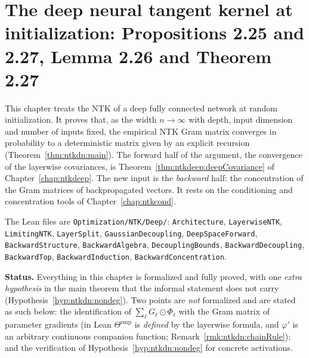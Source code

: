 \chapter{The deep neural tangent kernel at initialization: Propositions 2.25 and 2.27, Lemma 2.26 and Theorem 2.27}\label{chap:ntkdn}

This chapter treats the NTK of a deep fully connected network at random initialization. It proves that, as the width $n\to\infty$ with depth, input dimension and number of inputs fixed, the empirical NTK Gram matrix converges in probability to a deterministic matrix given by an explicit recursion (Theorem~\ref{thm:ntkdn:main}). The forward half of the argument, the convergence of the layerwise covariances, is Theorem~\ref{thm:ntkdeep:deepCovariance} of Chapter~\ref{chap:ntkdeep}. The new input is the \emph{backward} half: the concentration of the Gram matrices of backpropagated vectors. It rests on the conditioning and concentration tools of Chapter~\ref{chap:ntkcond}.

The Lean files are \texttt{Optimization/NTK/Deep/}: \texttt{Architecture}, \texttt{LayerwiseNTK}, \texttt{LimitingNTK}, \texttt{LayerSplit}, \texttt{GaussianDecoupling}, \texttt{DeepSpaceForward}, \texttt{BackwardStructure}, \texttt{BackwardAlgebra}, \texttt{DecouplingBounds}, \texttt{BackwardDecoupling}, \texttt{BackwardTop}, \texttt{BackwardInduction}, \texttt{BackwardConcentration}.

\medskip\noindent\textbf{Status.}
Everything in this chapter is formalized and fully proved, with one \emph{extra hypothesis} in the main theorem that the informal statement does not carry (Hypothesis~\ref{hyp:ntkdn:nondeg}). Two points are \emph{not} formalized and are stated as such below: the identification of $\sum_\ell G_\ell\odot\Phi_\ell$ with the Gram matrix of parameter gradients (in Lean $\Theta^{\mathrm{emp}}$ is \emph{defined} by the layerwise formula, and $\varphi'$ is an arbitrary continuous companion function; Remark~\ref{rmk:ntkdn:chainRule}); and the verification of Hypothesis~\ref{hyp:ntkdn:nondeg} for concrete activations.

